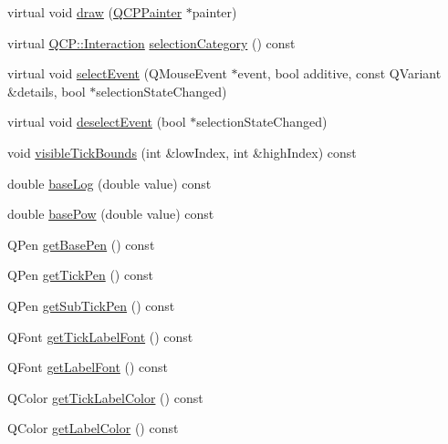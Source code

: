 \begin{DoxyCompactItemize}
virtual void \hyperlink{class_q_c_p_axis_a258b1e783eda5cd14ec5552c696a424e}{draw} (\hyperlink{class_q_c_p_painter}{Q\-C\-P\-Painter} $\ast$painter)
\item 
virtual \hyperlink{namespace_q_c_p_a2ad6bb6281c7c2d593d4277b44c2b037}{Q\-C\-P\-::\-Interaction} \hyperlink{class_q_c_p_axis_aca53b2f365dfc1257cba9e62395aa68f}{selection\-Category} () const 
\item 
virtual void \hyperlink{class_q_c_p_axis_aa8a5fe80e2898ec08ada26b5fbee9eca}{select\-Event} (Q\-Mouse\-Event $\ast$event, bool additive, const Q\-Variant \&details, bool $\ast$selection\-State\-Changed)
\item 
virtual void \hyperlink{class_q_c_p_axis_a53512242cde6ec21943a3ba10dbf78c3}{deselect\-Event} (bool $\ast$selection\-State\-Changed)
\item 
void \hyperlink{class_q_c_p_axis_a06320a944d1120732cc0d72fe1306d8b}{visible\-Tick\-Bounds} (int \&low\-Index, int \&high\-Index) const 
\item 
double \hyperlink{class_q_c_p_axis_a1385765db2419ee5fb5505a6cf9130fb}{base\-Log} (double value) const 
\item 
double \hyperlink{class_q_c_p_axis_a97d69f021a05126fcb978d0aefea47b8}{base\-Pow} (double value) const 
\item 
Q\-Pen \hyperlink{class_q_c_p_axis_a3eb0681d31baf579bb73b86a0153cb02}{get\-Base\-Pen} () const 
\item 
Q\-Pen \hyperlink{class_q_c_p_axis_a7f503910be40fb1717e1635be3ef17e1}{get\-Tick\-Pen} () const 
\item 
Q\-Pen \hyperlink{class_q_c_p_axis_ab4f7e60a40eb051c775afcaeab895c85}{get\-Sub\-Tick\-Pen} () const 
\item 
Q\-Font \hyperlink{class_q_c_p_axis_aef30b66668986523225089a67280ec7a}{get\-Tick\-Label\-Font} () const 
\item 
Q\-Font \hyperlink{class_q_c_p_axis_ab0768eb2879efb202645d19ff789e63e}{get\-Label\-Font} () const 
\item 
Q\-Color \hyperlink{class_q_c_p_axis_a0f8583f7ac24ccc70d39fdd2389cad6e}{get\-Tick\-Label\-Color} () const 
\item 
Q\-Color \hyperlink{class_q_c_p_axis_a42bd69b9e9c571f13624079be18ccdc1}{get\-Label\-Color} () const 
\end{DoxyCompactItemize}
